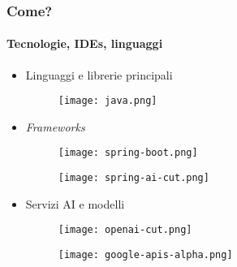 \begin{frame}[t,fragile] \frametitle{Come?}
\framesubtitle{Tecnologie, IDEs, linguaggi}
\begin{itemize}[leftmargin=10pt,align=right]
    \setlength\itemsep{.7em}
    \item[\alert{\faHandORight}] Linguaggi e librerie principali
    \begin{minipage}[t]{\textwidth}
        \begin{minipage}[t]{.2\textwidth}
            \begin{figure}[ht]
                \texttt{[image: java.png]}
            \end{figure}
        \end{minipage}
    \end{minipage}
    \item[\alert{\faHandORight}] \emph{Frameworks}
    \begin{minipage}[t]{\textwidth}
        \begin{minipage}[t]{.2\textwidth}
            \begin{figure}[ht]
                \texttt{[image: spring-boot.png]}
            \end{figure}
        \end{minipage}
        \begin{minipage}[t]{.2\textwidth}
            \begin{figure}[ht]
                \texttt{[image: spring-ai-cut.png]}
            \end{figure}
        \end{minipage}
    \end{minipage}
    \item[\alert{\faHandORight}] Servizi AI e modelli
    \begin{minipage}[t]{\textwidth}
        \begin{minipage}[t]{.2\textwidth}
            \begin{figure}[ht]
                \texttt{[image: openai-cut.png]}
            \end{figure}
        \end{minipage}
        \begin{minipage}[t]{.2\textwidth}
            \begin{figure}[ht]
                \texttt{[image: google-apis-alpha.png]}

\end{figure}
\end{minipage}
\end{minipage}
\end{itemize}
\end{frame}
